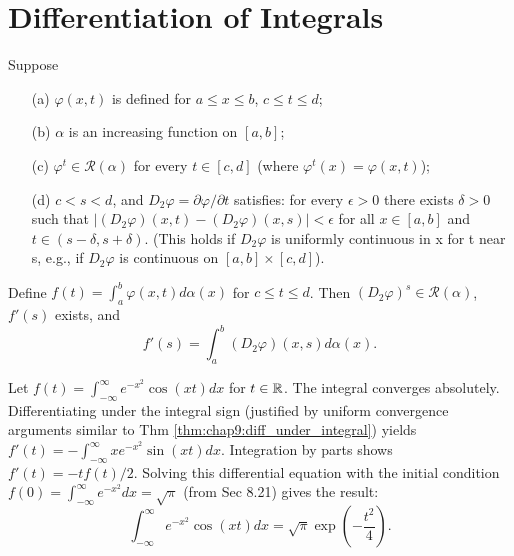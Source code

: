 \section{Differentiation of Integrals}


\begin{theorem}
  \label{thm:chap9:diff_under_integral}
  Suppose
  \begin{itemize}
    \item[(a)] $\varphi(x, t)$ is defined for $a \le x \le b$, $c \le t \le d$;
    \item[(b)] $\alpha$ is an increasing function on $[a, b]$;
    \item[(c)] $\varphi^t \in \mathcal{R}(\alpha)$ for every $t \in
      [c, d]$ (where $\varphi^t(x) = \varphi(x, t)$);
    \item[(d)] $c < s < d$, and $D_2 \varphi = \partial \varphi /
      \partial t$ satisfies: for every $\epsilon > 0$ there exists
      $\delta > 0$ such that $|(D_2 \varphi)(x, t) - (D_2 \varphi)(x,
      s)| < \epsilon$ for all $x \in [a, b]$ and $t \in (s-\delta,
      s+\delta)$. (This holds if $D_2 \varphi$ is uniformly
        continuous in x for t near s, e.g., if $D_2 \varphi$ is
      continuous on $[a,b] \times [c,d]$).
  \end{itemize}
  Define $f(t) = \int_a^b \varphi(x, t) d\alpha(x)$ for $c \le t \le
  d$. Then $(D_2 \varphi)^s \in \mathcal{R}(\alpha)$, $f'(s)$ exists, and
  \[
    f'(s) = \int_a^b (D_2 \varphi)(x, s) d\alpha(x).
  \]
\end{theorem}

\begin{example}
  \label{ex:chap9:gaussian_fourier_transform}
  Let $f(t) = \int_{-\infty}^{\infty} e^{-x^2} \cos(xt) dx$ for $t
  \in \mathbb{R}$. The integral converges absolutely. Differentiating under
  the integral sign (justified by uniform convergence arguments
  similar to Thm \ref{thm:chap9:diff_under_integral}) yields $f'(t) =
  -\int_{-\infty}^{\infty} x e^{-x^2} \sin(xt) dx$. Integration by
  parts shows $f'(t) = -t f(t) / 2$. Solving this differential
  equation with the initial condition $f(0) = \int_{-\infty}^{\infty}
  e^{-x^2} dx = \sqrt{\pi}$ (from Sec 8.21) gives the result:
  \[
    \int_{-\infty}^{\infty} e^{-x^2} \cos(xt) dx = \sqrt{\pi}
    \exp\left(-\frac{t^2}{4}\right).
  \]
\end{example}

